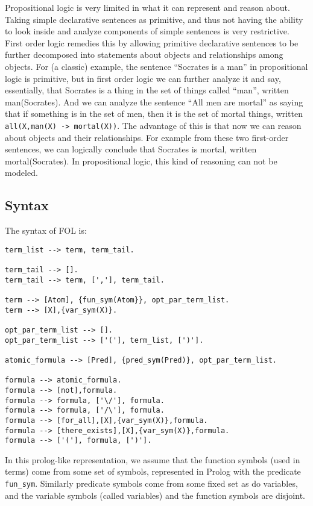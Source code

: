 Propositional logic is very limited in what it can represent and
reason about.  Taking simple declarative sentences as primitive, and
thus not having the ability to look inside and analyze components of
simple sentences is very restrictive.  First order logic remedies this
by allowing primitive declarative sentences to be further decomposed
into statements about objects and relationships among objects.  For
(a classic) example, the sentence ``Socrates is a man'' in
propositional logic is primitive, but in first order logic we can
further analyze it and say, essentially, that Socrates is a thing in
the set of things called ``man'', written man(Socrates).  And we can
analyze the sentence ``All men are mortal'' as saying that if
something is in the set of men, then it is the set of mortal things,
written \verb|all(X,man(X) -> mortal(X))|.  The advantage of this is
that now we can reason about objects and their relationships.  For
example from these two first-order sentences, we can logically
conclude that Socrates is mortal, written mortal(Socrates).  In
propositional logic, this kind of reasoning can not be modeled.

\subsection{Syntax}

The syntax of FOL is:
\begin{verbatim}
term_list --> term, term_tail.

term_tail --> [].
term_tail --> term, [','], term_tail.

term --> [Atom], {fun_sym(Atom}}, opt_par_term_list.
term --> [X],{var_sym(X)}.

opt_par_term_list --> [].
opt_par_term_list --> ['('], term_list, [')'].

atomic_formula --> [Pred], {pred_sym(Pred)}, opt_par_term_list.

formula --> atomic_formula.
formula --> [not],formula.
formula --> formula, ['\/'], formula.
formula --> formula, ['/\'], formula.
formula --> [for_all],[X],{var_sym(X)},formula.
formula --> [there_exists],[X],{var_sym(X)},formula.
formula --> ['('], formula, [')'].
\end{verbatim}

In this prolog-like representation, we assume that the function
symbols (used in terms) come from some set of symbols, represented in
Prolog with the predicate \verb|fun_sym|.  Similarly predicate symbols
come from some fixed set as do variables, and the variable symbols
(called variables) and the function symbols are disjoint.

